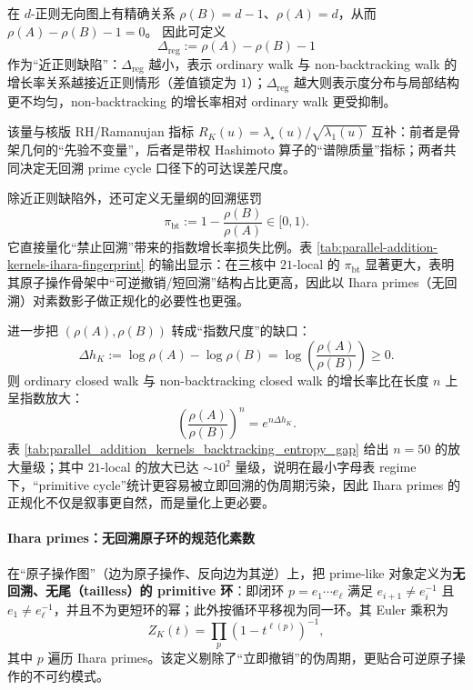 \begin{remark}\label{rem:ihara-delta-reg}
在 $d$-正则无向图上有精确关系 \(\rho(B)=d-1\)、\(\rho(A)=d\)，从而 \(\rho(A)-\rho(B)-1=0\)。
因此可定义
$$
\Delta_{\mathrm{reg}}:=\rho(A)-\rho(B)-1
$$
作为“近正则缺陷”：\(\Delta_{\mathrm{reg}}\) 越小，表示 ordinary walk 与 non-backtracking walk 的增长率关系越接近正则情形（差值锁定为 \(1\)）；\(\Delta_{\mathrm{reg}}\) 越大则表示度分布与局部结构更不均匀，non-backtracking 的增长率相对 ordinary walk 更受抑制。

该量与核版 RH/Ramanujan 指标 \(R_K(u)=\lambda_\star(u)/\sqrt{\lambda_1(u)}\) 互补：前者是骨架几何的“先验不变量”，后者是带权 Hashimoto 算子的“谱隙质量”指标；两者共同决定无回溯 prime cycle 口径下的可达误差尺度。
\end{remark}

\begin{remark}\label{rem:ihara-pi-bt}
除近正则缺陷外，还可定义无量纲的回溯惩罚
$$
\pi_{\mathrm{bt}}:=1-\frac{\rho(B)}{\rho(A)}\in[0,1).
$$
它直接量化“禁止回溯”带来的指数增长率损失比例。表 \ref{tab:parallel-addition-kernels-ihara-fingerprint} 的输出显示：在三核中 \(21\)-local 的 \(\pi_{\mathrm{bt}}\) 显著更大，表明其原子操作骨架中“可逆撤销/短回溯”结构占比更高，因此以 Ihara primes（无回溯）对素数影子做正规化的必要性也更强。
\end{remark}

\begin{remark}\label{rem:ihara-entropy-gap}
进一步把 \((\rho(A),\rho(B))\) 转成“指数尺度”的缺口：
\[
\Delta h_K:=\log\rho(A)-\log\rho(B)=\log\!\left(\frac{\rho(A)}{\rho(B)}\right)\ge 0.
\]
则 ordinary closed walk 与 non-backtracking closed walk 的增长率比在长度 \(n\) 上呈指数放大：
\[
\left(\frac{\rho(A)}{\rho(B)}\right)^n=e^{n\Delta h_K}.
\]
表 \ref{tab:parallel_addition_kernels_backtracking_entropy_gap} 给出 \(n=50\) 的放大量级；其中 \(21\)-local 的放大已达 \(\sim 10^2\) 量级，说明在最小字母表 regime 下，“primitive cycle”统计更容易被立即回溯的伪周期污染，因此 Ihara primes 的正规化不仅是叙事更自然，而是量化上更必要。

\end{remark}

\paragraph{Ihara primes：无回溯原子环的规范化素数}
在“原子操作图”（边为原子操作、反向边为其逆）上，把 prime-like 对象定义为\textbf{无回溯、无尾（tailless）的 primitive 环}：即闭环 $p=e_1\cdots e_\ell$ 满足 $e_{i+1}\neq e_i^{-1}$ 且 $e_1\neq e_\ell^{-1}$，并且不为更短环的幂；此外按循环平移视为同一环。其 Euler 乘积为
\[
Z_K(t)=\prod_{p}\left(1-t^{\ell(p)}\right)^{-1},
\]
其中 $p$ 遍历 Ihara primes。该定义剔除了“立即撤销”的伪周期，更贴合可逆原子操作的不可约模式。


